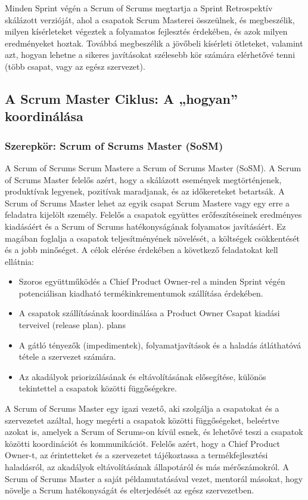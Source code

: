 \documentclass[12pt,a4paper,parskip=full]{scrartcl}
\begin{document}
Minden Sprint végén a Scrum of Scrums megtartja a Sprint Retrospektív skálázott verzióját, ahol a csapatok Scrum Masterei összeülnek, és megbeszélik, milyen kísérleteket végeztek a folyamatos fejlesztés érdekében, és azok milyen eredményeket hoztak. Továbbá megbeszélik a jövőbeli kísérleti ötleteket, valamint azt, hogyan lehetne a sikeres javításokat szélesebb kör számára elérhetővé tenni (több csapat, vagy az egész szervezet).

\subsection{A Scrum Master Ciklus: A „hogyan” koordinálása}\label{the-scrum-master-cycle}

\subsubsection{Szerepkör: Scrum of Scrums Master (SoSM)}\label{role-the-scrum-of-scrums-master}

A Scrum of Scrums Scrum Mastere a Scrum of Scrums Master (SoSM). A Scrum of Scrums Master felelős azért, hogy a skálázott események megtörténjenek, produktívak legyenek, pozitívak maradjanak, és az időkereteket betartsák. A Scrum of Scrums Master lehet az egyik csapat Scrum Mastere vagy egy erre a feladatra kijelölt személy. Felelős a csapatok együttes erőfeszítéseinek eredményes kiadásáért és a Scrum of Scrums hatékonyságának folyamatos javításáért. Ez magában foglalja a csapatok teljesítményének növelését, a költségek csökkentését és a jobb minőséget. A célok elérése érdekében a következő feladatokat kell ellátnia:

\begin{itemize}
\itemsep1pt\parskip0pt
\item
 Szoros együttműködés a Chief Product Owner-rel a minden Sprint végén potenciálisan kiadható termékinkrementumok szállítása érdekében.
\item
 A csapatok szállításának koordinálása a Product Owner Csapat kiadási terveivel (release plan).
  plans
\item
 A gátló tényezők (impedimentek), folyamatjavítások és a haladás átláthatóvá tétele a szervezet számára.
\item
 Az akadályok priorizálásának és eltávolításának elősegítése, különös tekintettel a csapatok közötti függőségekre.
\end{itemize}

A Scrum of Scrums Master egy igazi vezető, aki szolgálja a csapatokat és a szervezetet azáltal, hogy megérti a csapatok közötti függőségeket, beleértve azokat is, amelyek a Scrum of Scrums-on kívül esnek, és lehetővé teszi a csapatok közötti koordinációt és kommunikációt. Felelős azért, hogy a Chief Product Owner-t, az érintetteket és a szervezetet tájékoztassa a termékfejlesztési haladásról, az akadályok eltávolításának állapotáról és más mérőszámokról.  A Scrum of Scrums Master a saját példamutatásával vezet, mentorál másokat, hogy növelje a Scrum hatékonyságát és elterjedését az egész szervezetben.
\end{document}
